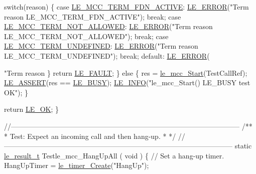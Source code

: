 \begin{DoxyCodeInclude}
{{{{{       \textcolor{keywordflow}{switch}(reason)
       \{
           \textcolor{keywordflow}{case} \hyperlink{le__mcc__interface_8h_abda706f723ba619f9bc460bcc9a4960dad24334b942be14ab63255b29492ec3f9}{LE\_MCC\_TERM\_FDN\_ACTIVE}:
               \hyperlink{le__log_8h_a353590f91b3143a7ba3a416ae5a50c3d}{LE\_ERROR}(\textcolor{stringliteral}{"Term reason LE\_MCC\_TERM\_FDN\_ACTIVE"});
               \textcolor{keywordflow}{break};
           \textcolor{keywordflow}{case} \hyperlink{le__mcc__interface_8h_abda706f723ba619f9bc460bcc9a4960dac3b888429481ec4ea6cd94de80d11a2c}{LE\_MCC\_TERM\_NOT\_ALLOWED}:
               \hyperlink{le__log_8h_a353590f91b3143a7ba3a416ae5a50c3d}{LE\_ERROR}(\textcolor{stringliteral}{"Term reason LE\_MCC\_TERM\_NOT\_ALLOWED"});
               \textcolor{keywordflow}{break};
           \textcolor{keywordflow}{case} \hyperlink{le__mcc__interface_8h_abda706f723ba619f9bc460bcc9a4960da3dbb90bf0628971a6afbd4773fc97c1a}{LE\_MCC\_TERM\_UNDEFINED}:
               \hyperlink{le__log_8h_a353590f91b3143a7ba3a416ae5a50c3d}{LE\_ERROR}(\textcolor{stringliteral}{"Term reason LE\_MCC\_TERM\_UNDEFINED"});
               \textcolor{keywordflow}{break};
           \textcolor{keywordflow}{default}:
               \hyperlink{le__log_8h_a353590f91b3143a7ba3a416ae5a50c3d}{LE\_ERROR}(\textcolor{stringliteral}{"Term reason %
       \}
       \textcolor{keywordflow}{return} \hyperlink{le__basics_8h_a1cca095ed6ebab24b57a636382a6c86cac409634423b6b1ef09643529f6224798}{LE\_FAULT};
    \}
    \textcolor{keywordflow}{else}
    \{
        res = \hyperlink{le__mcc__interface_8h_a72a32869bb23864b3e86c606368bed70}{le\_mcc\_Start}(TestCallRef);
        \hyperlink{le__log_8h_ac0dbbef91dc0fed449d0092ff0557b39}{LE\_ASSERT}(res == \hyperlink{le__basics_8h_a1cca095ed6ebab24b57a636382a6c86ca92b0367090993d8b41d1560663d01e8d}{LE\_BUSY});
        \hyperlink{le__log_8h_a23e6d206faa64f612045d688cdde5808}{LE\_INFO}(\textcolor{stringliteral}{"le\_mcc\_Start() LE\_BUSY test OK"});
    \}

    \textcolor{keywordflow}{return} \hyperlink{le__basics_8h_a1cca095ed6ebab24b57a636382a6c86ca5066a4bcec691c6b67843b8f79656422}{LE\_OK};
\}

\textcolor{comment}{//--------------------------------------------------------------------------------------------------}\textcolor{comment}{}
\textcolor{comment}{/**}
\textcolor{comment}{ * Test: Expect an incoming call and then hang-up.}
\textcolor{comment}{ *}
\textcolor{comment}{ */}
\textcolor{comment}{//--------------------------------------------------------------------------------------------------}
\textcolor{keyword}{static} \hyperlink{le__basics_8h_a1cca095ed6ebab24b57a636382a6c86c}{le\_result\_t} Testle\_mcc\_HangUpAll
(
    \textcolor{keywordtype}{void}
)
\{
    \textcolor{comment}{// Set a hang-up timer.}
    HangUpTimer = \hyperlink{le__timer_8h_aee41169a210378b369f440cf99146522}{le\_timer\_Create}(\textcolor{stringliteral}{"HangUp"});

}}}}}}
\end{DoxyCodeInclude}
